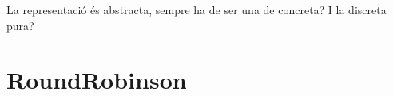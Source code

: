 La representació és abstracta, sempre ha de ser una de concreta? I la discreta pura?






\section{RoundRobinson}





